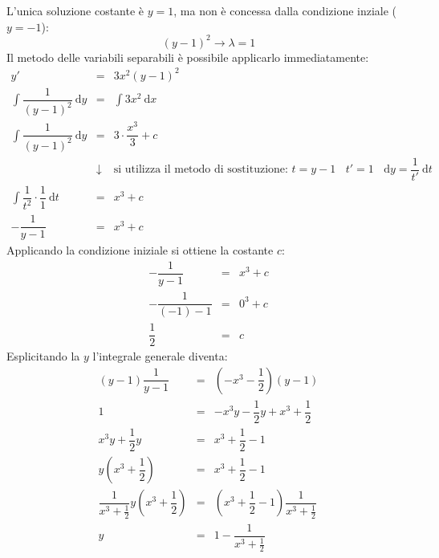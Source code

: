\documentclass[a4paper]{article}
\begin{document}
	\noindent
	L'unica soluzione costante è $y = 1$, ma non è concessa dalla condizione inziale ($y = -1$):
	\begin{equation*}
		\left(y-1\right)^{2} \rightarrow \lambda = 1
	\end{equation*}
	Il metodo delle variabili separabili è possibile applicarlo immediatamente:
	\begin{equation*}
		\begin{array}{rcl}
			y' &=& 3x^{2}\left(y-1\right)^{2} \\ [.5em]
			\displaystyle\int \dfrac{1}{\left(y-1\right)^{2}} \: \mathrm{d}y &=& \displaystyle\int 3x^{2} \: \mathrm{d}x \\ [1em]
			\displaystyle\int \dfrac{1}{\left(y-1\right)^{2}} \: \mathrm{d}y &=& 3 \cdot \dfrac{x^{3}}{3} + c \\ [1em]
			&\downarrow& \text{si utilizza il metodo di sostituzione: } t = y-1 \:\:\:\: t' = 1 \:\:\:\: \mathrm{d}y = \dfrac{1}{t'} \:\mathrm{d}t \\ 
			\displaystyle\int \dfrac{1}{t^{2}} \cdot \dfrac{1}{1} \: \mathrm{d}t &=& x^{3} + c \\ [1em]
			-\dfrac{1}{y-1} &=& x^{3} + c
		\end{array}
	\end{equation*}
	Applicando la condizione iniziale si ottiene la costante $c$:
	\begin{equation*}
		\begin{array}{rcl}
			-\dfrac{1}{y-1} &=& x^{3} + c \\ [1em]
			-\dfrac{1}{\left(-1\right)-1} &=& 0^{3} + c \\ [1em]
			\dfrac{1}{2} &=& c
		\end{array}
	\end{equation*}
	Esplicitando la $y$ l'integrale generale diventa:
	\begin{equation*}
		\begin{array}{rcl}
			\left(y-1\right)\dfrac{1}{y-1} &=& \left(- x^{3} - \dfrac{1}{2}\right) \left(y-1\right) \\ [1em]
			1 &=& -x^{3}y -\dfrac{1}{2}y + x^{3} + \dfrac{1}{2} \\ [1em]
			x^{3}y + \dfrac{1}{2}y &=& x^{3} + \dfrac{1}{2} - 1 \\ [.8em]
			y \left(x^{3} + \dfrac{1}{2}\right) &=& x^{3} + \dfrac{1}{2} - 1 \\ [.8em]
			\dfrac{1}{x^{3} + \frac{1}{2}} y \left(x^{3} + \dfrac{1}{2}\right) &=& \left(x^{3} + \dfrac{1}{2} - 1\right)\dfrac{1}{x^{3} + \frac{1}{2}} \\ [.8em]
			y &=& 1 - \dfrac{1}{x^{3} + \frac{1}{2}}
		\end{array}
	\end{equation*}
\end{document}
